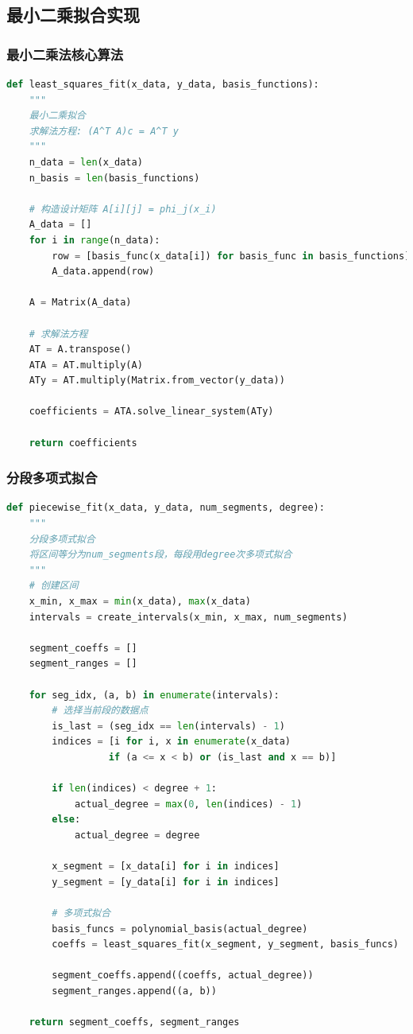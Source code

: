 \documentclass[a4paper,12pt]{article}
\theoremstyle{definition}
\begin{document}
\subsection{最小二乘拟合实现}

\subsubsection{最小二乘法核心算法}

\begin{lstlisting}[language=Python,caption={最小二乘拟合核心实现}]
def least_squares_fit(x_data, y_data, basis_functions):
    """
    最小二乘拟合
    求解法方程: (A^T A)c = A^T y
    """
    n_data = len(x_data)
    n_basis = len(basis_functions)
    
    # 构造设计矩阵 A[i][j] = phi_j(x_i)
    A_data = []
    for i in range(n_data):
        row = [basis_func(x_data[i]) for basis_func in basis_functions]
        A_data.append(row)
    
    A = Matrix(A_data)
    
    # 求解法方程
    AT = A.transpose()
    ATA = AT.multiply(A)
    ATy = AT.multiply(Matrix.from_vector(y_data))
    
    coefficients = ATA.solve_linear_system(ATy)
    
    return coefficients
\end{lstlisting}

\subsubsection{分段多项式拟合}

\begin{lstlisting}[language=Python,caption={分段多项式拟合算法}]
def piecewise_fit(x_data, y_data, num_segments, degree):
    """
    分段多项式拟合
    将区间等分为num_segments段，每段用degree次多项式拟合
    """
    # 创建区间
    x_min, x_max = min(x_data), max(x_data)
    intervals = create_intervals(x_min, x_max, num_segments)
    
    segment_coeffs = []
    segment_ranges = []
    
    for seg_idx, (a, b) in enumerate(intervals):
        # 选择当前段的数据点
        is_last = (seg_idx == len(intervals) - 1)
        indices = [i for i, x in enumerate(x_data)
                  if (a <= x < b) or (is_last and x == b)]
        
        if len(indices) < degree + 1:
            actual_degree = max(0, len(indices) - 1)
        else:
            actual_degree = degree
        
        x_segment = [x_data[i] for i in indices]
        y_segment = [y_data[i] for i in indices]
        
        # 多项式拟合
        basis_funcs = polynomial_basis(actual_degree)
        coeffs = least_squares_fit(x_segment, y_segment, basis_funcs)
        
        segment_coeffs.append((coeffs, actual_degree))
        segment_ranges.append((a, b))
    
    return segment_coeffs, segment_ranges
\end{lstlisting}
\end{document}
